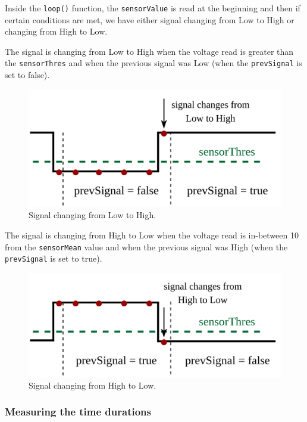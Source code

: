 \documentclass[12pt]{report}
\begin{document}
Inside the \verb|loop()| function, the \verb|sensorValue| is read at the beginning and then if certain conditions are met, we have either signal changing from Low to High or changing from High to Low.

The signal is changing from Low to High when the voltage read is greater than the \verb|sensorThres| and when the previous signal was Low (when the \verb|prevSignal| is set to false).

\begin{figure}[H]
\centering\includegraphics[scale=0.18]{lowtohigh}
\caption{Signal changing from Low to High.}				
\label{fig:arduino_code}
\end{figure}

The signal is changing from High to Low when the voltage read is in-between 10 from the \verb|sensorMean| value and when the previous signal was High (when the \verb|prevSignal| is set to true). 

\begin{figure}[H]
\centering\includegraphics[scale=0.18]{hightolow}
\caption{Signal changing from High to Low.}				
\label{fig:arduino_code}
\end{figure}

\subsubsection{Measuring the time durations}
\end{document}
